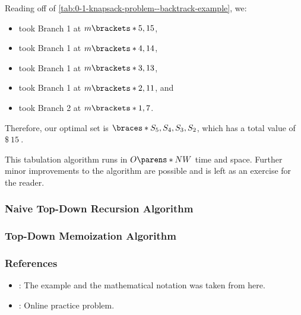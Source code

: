 Reading off of \cref{tab:0-1-knapsack-problem--backtrack-example}, we:
\begin{itemize}
    \item took Branch 1 at $m \brackets*{5, 15}$,
    \item took Branch 1 at $m \brackets*{4, 14}$,
    \item took Branch 1 at $m \brackets*{3, 13}$,
    \item took Branch 1 at $m \brackets*{2, 11}$, and
    \item took Branch 2 at $m \brackets*{1, 7}$.
\end{itemize}

Therefore, our optimal set is $\braces*{S_5, S_4, S_3, S_2}$, which has a total value of $\SI{15}[\$]{}$.

This tabulation algorithm runs in $O\parens*{NW}$ time and space. Further minor improvements to the algorithm are possible and is left as an exercise for the reader.


\subsubsection{Naive Top-Down Recursion Algorithm}



\subsubsection{Top-Down Memoization Algorithm}



\subsubsection{References}
\begin{itemize}
    \item \href{https://en.wikipedia.org/wiki/Knapsack_problem}{}: The example and the mathematical notation was taken from here.
    \item \href{https://practice.geeksforgeeks.org/problems/0-1-knapsack-problem0945/1}{}: Online practice problem.%
\end{itemize}

